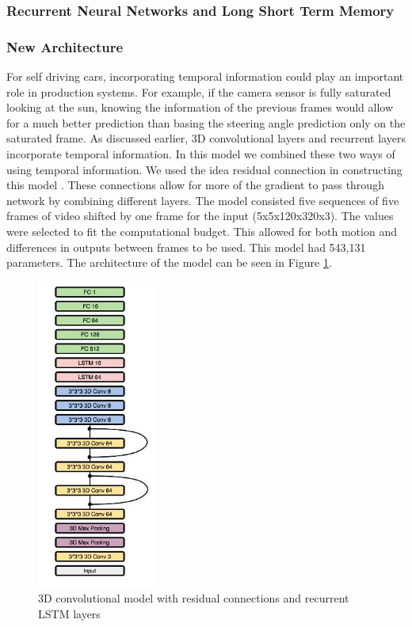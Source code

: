 \documentclass[10pt,twocolumn,letterpaper]{article}
\begin{document}
\subsubsection{Recurrent Neural Networks and Long Short Term Memory}




\subsubsection{New Architecture}
For self driving cars, incorporating temporal information could play an important role in production systems. For example, if the camera sensor is fully saturated looking at the sun, knowing the information of the previous frames would allow for a much better prediction than basing the steering angle prediction only on the saturated frame. As discussed earlier, 3D convolutional layers and recurrent layers incorporate temporal information. In this model we combined these two ways of using temporal information. We used the idea residual connection in constructing this model \cite{he2016deep}. These connections allow for more of the gradient to pass through network by combining different layers. The model consisted five sequences of five frames of video shifted by one frame for the input (5x5x120x320x3). The values were selected to fit the computational budget. This allowed for both motion and differences in outputs between frames to be used. This model had 543,131 parameters. The architecture of the model can be seen in Figure \ref{3dconvlstm_graph}.



\begin{figure}[!htb]
	\includegraphics[width=4cm]{3d_lstm_model_architecture.JPG}
	\centering
	\caption{3D convolutional model with residual connections and recurrent LSTM layers}
	\label{3dconvlstm_graph}
\end{figure}
\end{document}
